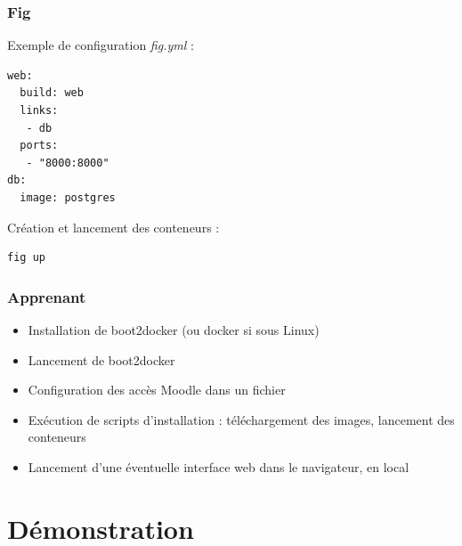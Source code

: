 \documentclass[10pt, compress]{beamer}
\begin{document}
  \begin{frame}[fragile]
  \frametitle{Fig}

  Exemple de configuration \emph{fig.yml} :

  \begin{verbatim}
web:
  build: web
  links:
   - db
  ports:
   - "8000:8000"
db:
  image: postgres
  \end{verbatim}
  
  Création et lancement des conteneurs :
  
    \begin{verbatim}
fig up
  \end{verbatim}
\end{frame}

\begin{frame}[fragile]
  \frametitle{Apprenant}

  \begin{itemize}[<+- | alert@+>]
      \item Installation de boot2docker (ou docker si sous Linux)
      \item Lancement de boot2docker
      \item Configuration des accès Moodle dans un fichier
      \item Exécution de scripts d'installation : téléchargement des images, lancement des conteneurs
      \item Lancement d'une éventuelle interface web dans le navigateur, en local
    \end{itemize}
\end{frame}


\section{Démonstration}

\end{document}
